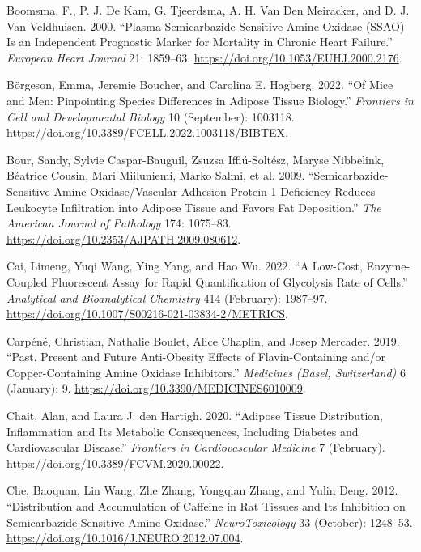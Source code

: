 \documentclass[
  letterpaper,
  DIV=11,
  numbers=noendperiod]{scrreprt}
\newlength{\cslhangindent}
\newenvironment{CSLReferences}[2] %
 {\begin{list}{}{%
  \setlength{\itemindent}{0pt}
  \setlength{\leftmargin}{0pt}
  \setlength{\parsep}{0pt}
  \ifodd #1
   \setlength{\leftmargin}{\cslhangindent}
   \setlength{\itemindent}{-1\cslhangindent}
  \fi
  \setlength{\itemsep}{#2\baselineskip}}}
 {\end{list}}
\begin{document}
\begin{CSLReferences}{1}{0}
Boomsma, F., P. J. De Kam, G. Tjeerdsma, A. H. Van Den Meiracker, and D.
J. Van Veldhuisen. 2000. {``Plasma Semicarbazide-Sensitive Amine Oxidase
(SSAO) Is an Independent Prognostic Marker for Mortality in Chronic
Heart Failure.''} \emph{European Heart Journal} 21: 1859--63.
\url{https://doi.org/10.1053/EUHJ.2000.2176}.

Börgeson, Emma, Jeremie Boucher, and Carolina E. Hagberg. 2022. {``Of
Mice and Men: Pinpointing Species Differences in Adipose Tissue
Biology.''} \emph{Frontiers in Cell and Developmental Biology} 10
(September): 1003118.
\url{https://doi.org/10.3389/FCELL.2022.1003118/BIBTEX}.

Bour, Sandy, Sylvie Caspar-Bauguil, Zsuzsa Iffiú-Soltész, Maryse
Nibbelink, Béatrice Cousin, Mari Miiluniemi, Marko Salmi, et al. 2009.
{``Semicarbazide-Sensitive Amine Oxidase/Vascular Adhesion Protein-1
Deficiency Reduces Leukocyte Infiltration into Adipose Tissue and Favors
Fat Deposition.''} \emph{The American Journal of Pathology} 174:
1075--83. \url{https://doi.org/10.2353/AJPATH.2009.080612}.

Cai, Limeng, Yuqi Wang, Ying Yang, and Hao Wu. 2022. {``A Low-Cost,
Enzyme-Coupled Fluorescent Assay for Rapid Quantification of Glycolysis
Rate of Cells.''} \emph{Analytical and Bioanalytical Chemistry} 414
(February): 1987--97.
\url{https://doi.org/10.1007/S00216-021-03834-2/METRICS}.

Carpéné, Christian, Nathalie Boulet, Alice Chaplin, and Josep Mercader.
2019. {``Past, Present and Future Anti-Obesity Effects of
Flavin-Containing and/or Copper-Containing Amine Oxidase Inhibitors.''}
\emph{Medicines (Basel, Switzerland)} 6 (January): 9.
\url{https://doi.org/10.3390/MEDICINES6010009}.

Chait, Alan, and Laura J. den Hartigh. 2020. {``Adipose Tissue
Distribution, Inflammation and Its Metabolic Consequences, Including
Diabetes and Cardiovascular Disease.''} \emph{Frontiers in
Cardiovascular Medicine} 7 (February).
\url{https://doi.org/10.3389/FCVM.2020.00022}.

Che, Baoquan, Lin Wang, Zhe Zhang, Yongqian Zhang, and Yulin Deng. 2012.
{``Distribution and Accumulation of Caffeine in Rat Tissues and Its
Inhibition on Semicarbazide-Sensitive Amine Oxidase.''}
\emph{NeuroToxicology} 33 (October): 1248--53.
\url{https://doi.org/10.1016/J.NEURO.2012.07.004}.


\end{CSLReferences}
\end{document}
